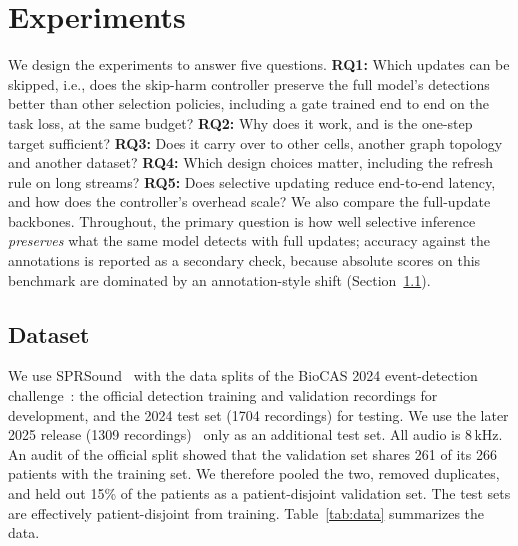 \section{Experiments}
\label{sec:experiments}

We design the experiments to answer five questions. \textbf{RQ1:} Which updates can be skipped, i.e., does the skip-harm controller preserve the full model's detections better than other selection policies, including a gate trained end to end on the task loss, at the same budget? \textbf{RQ2:} Why does it work, and is the one-step target sufficient? \textbf{RQ3:} Does it carry over to other cells, another graph topology and another dataset? \textbf{RQ4:} Which design choices matter, including the refresh rule on long streams? \textbf{RQ5:} Does selective updating reduce end-to-end latency, and how does the controller's overhead scale? We also compare the full-update backbones. Throughout, the primary question is how well selective inference \emph{preserves} what the same model detects with full updates; accuracy against the annotations is reported as a secondary check, because absolute scores on this benchmark are dominated by an annotation-style shift (Section~\ref{sec:data}).

\subsection{Dataset}
\label{sec:data}
We use SPRSound~\cite{zhang2022sprsound} with the data splits of the BioCAS 2024 event-detection challenge~\cite{zhang2024meta}: the official detection training and validation recordings for development, and the 2024 test set (1704 recordings) for testing. We use the later 2025 release (1309 recordings)~\cite{sprsound2025repo} only as an additional test set. All audio is 8\,kHz. An audit of the official split showed that the validation set shares 261 of its 266 patients with the training set. We therefore pooled the two, removed duplicates, and held out 15\% of the patients as a patient-disjoint validation set. The test sets are effectively patient-disjoint from training. Table~\ref{tab:data} summarizes the data.

